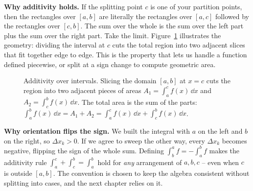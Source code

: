 \textbf{Why additivity holds.} If the splitting point $c$ is one of your
partition points, then the rectangles over $[a,b]$ are literally the rectangles
over $[a,c]$ followed by the rectangles over $[c,b]$. The sum over the whole is
the sum over the left part plus the sum over the right part. Take the limit.
Figure~\ref{ch20:fig-additivity} illustrates the geometry: dividing the interval
at $c$ cuts the total region into two adjacent slices that fit together edge to
edge. This is the property that lets us handle a function defined piecewise, or
split at a sign change to compute geometric area.

\begin{figure}[htbp]
\centering
{}
\caption{Additivity over intervals. Slicing the domain $[a,b]$ at $x=c$ cuts the region into two adjacent pieces of areas $A_1 = \int_a^c f(x)\,\dd x$ and $A_2 = \int_c^b f(x)\,\dd x$. The total area is the sum of the parts: $\int_a^b f(x)\,\dd x = A_1 + A_2 = \int_a^c f(x)\,\dd x + \int_c^b f(x)\,\dd x$.}
\label{ch20:fig-additivity}
\end{figure}

\textbf{Why orientation flips the sign.} We built the integral with $a$ on the
left and $b$ on the right, so $\Delta x_k > 0$. If we agree to sweep the other
way, every $\Delta x_k$ becomes negative, flipping the sign of the whole sum.
Defining $\int_b^a f = -\int_a^b f$ makes the additivity rule
$\int_a^c + \int_c^b = \int_a^b$ hold for \emph{any} arrangement of $a,b,c$ --
even when $c$ is outside $[a,b]$. The convention is chosen to keep the algebra
consistent without splitting into cases, and the next chapter relies on it.

